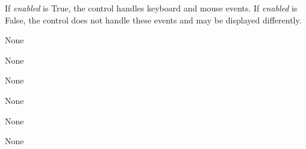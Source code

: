 \documentclass[letterpaper,10pt,english]{sphinxmanual}
\begin{document}
\begin{fulllineitems}
\begin{fulllineitems}
If \emph{enabled} is True, the control handles keyboard and mouse events.
If \emph{enabled} is False, the control does not handle these events and may
be displayed differently.

\end{fulllineitems}


\begin{fulllineitems}
\label{api:controls.TextIOBox.flush}
None

\end{fulllineitems}


\begin{fulllineitems}
\label{api:controls.TextIOBox.getvalue}
None

\end{fulllineitems}


\begin{fulllineitems}
\label{api:controls.TextIOBox.isatty}
None

\end{fulllineitems}


\begin{fulllineitems}
\label{api:controls.TextIOBox.next}
None

\end{fulllineitems}


\begin{fulllineitems}
\label{api:controls.TextIOBox.read}
None

\end{fulllineitems}


\begin{fulllineitems}
\label{api:controls.TextIOBox.readline}
None


\end{fulllineitems}
\end{fulllineitems}
\end{document}
